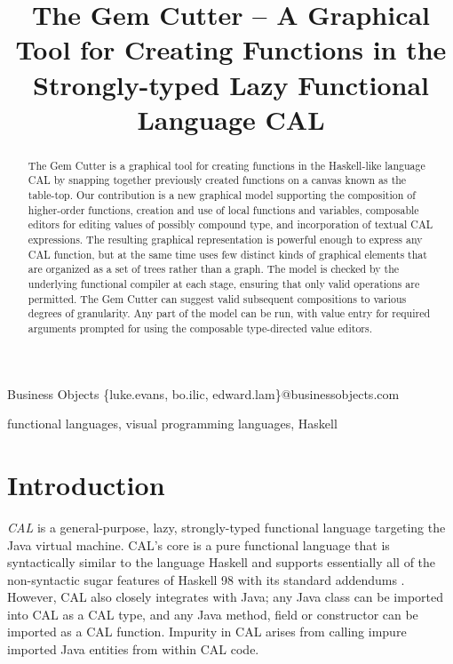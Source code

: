\documentclass[preprint]{sigplanconf}
\let\cite=\citep
\begin{document}
\copyrightdata{[to be supplied]} 

\titlebanner{}      %
\preprintfooter{}   %

\title{The Gem Cutter -- A Graphical Tool for Creating Functions in the Strongly-typed Lazy Functional Language CAL}

           {Business Objects}
           {\{luke.evans, bo.ilic, edward.lam\}@businessobjects.com}

\maketitle

\begin{abstract}
The Gem Cutter is a graphical tool for creating functions in the
Haskell-like language CAL by snapping together previously created
functions on a canvas known as the table-top. Our contribution is a
new graphical model supporting the composition of higher-order
functions, creation and use of local functions and variables,
composable editors for editing values of possibly compound type,
and incorporation of textual CAL
expressions. The resulting graphical representation is powerful enough
to express any CAL function, but at the same time uses few distinct
kinds of graphical elements that are organized as a set of trees
rather than a graph. The model is checked by the underlying functional
compiler at each stage, ensuring that only valid operations are
permitted. The Gem Cutter can suggest valid subsequent compositions to
various degrees of granularity. Any part of the model can be run, with
value entry for required arguments prompted for using the composable
type-directed value editors.
\end{abstract}



\keywords
functional languages, visual programming languages, Haskell

\section{Introduction}
\label{sec:intro}

{\it CAL} is a general-purpose, lazy, strongly-typed functional
language targeting the Java virtual machine.  CAL's core is a pure
functional language that is syntactically similar to the language
Haskell and supports essentially all of the non-syntactic sugar
features of Haskell 98 with its standard addendums \cite{haskell98}.
However, CAL also closely integrates with Java; any Java class can be
imported into CAL as a CAL type, and any Java method, field or
constructor can be imported as a CAL function. Impurity in CAL arises
from calling impure imported Java entities from within CAL code.
\end{document}
